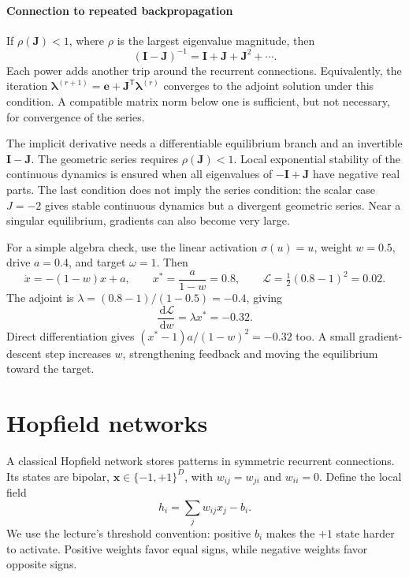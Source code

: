 \documentclass[11pt, oneside]{book}
\newcommand{\dd}{\,\mathrm{d}}
\newcommand{\T}{^{\mathsf{T}}}           %
\newcommand{\loss}{\mathcal{L}}          %
\newcommand{\params}{\boldsymbol{\theta}}   %
\let\originalsection\section
\renewcommand{\section}{\Needspace{7\baselineskip}\originalsection}
\begin{document}
\paragraph{Connection to repeated backpropagation} If $\rho(\mathbf{J})<1$, where $\rho$ is the largest eigenvalue magnitude, then
\[
 (\mathbf{I}-\mathbf{J})^{-1}=\mathbf{I}+\mathbf{J}+\mathbf{J}^2+\cdots.
\]
Each power adds another trip around the recurrent connections. Equivalently, the iteration $\boldsymbol{\lambda}^{(r+1)}=\mathbf{e}+\mathbf{J}\T\boldsymbol{\lambda}^{(r)}$ converges to the adjoint solution under this condition. A compatible matrix norm below one is sufficient, but not necessary, for convergence of the series.

\begin{notebox}[title={Three conditions that should not be mixed up}]
The implicit derivative needs a differentiable equilibrium branch and an invertible $\mathbf{I}-\mathbf{J}$. The geometric series requires $\rho(\mathbf{J})<1$. Local exponential stability of the continuous dynamics is ensured when all eigenvalues of $-\mathbf{I}+\mathbf{J}$ have negative real parts. The last condition does not imply the series condition: the scalar case $J=-2$ gives stable continuous dynamics but a divergent geometric series. Near a singular equilibrium, gradients can also become very large.
\end{notebox}

\begin{exbox}[title={One recurrent unit, with a checkable gradient}]
For a simple algebra check, use the linear activation $\sigma(u)=u$, weight $w=0.5$, drive $a=0.4$, and target $\omega=1$. Then
\[
 \dot x=-(1-w)x+a,\qquad x^*=\frac{a}{1-w}=0.8,
 \qquad \loss=\tfrac12(0.8-1)^2=0.02.
\]
The adjoint is $\lambda=(0.8-1)/(1-0.5)=-0.4$, giving
\[
 \frac{\dd\loss}{\dd w}=\lambda x^*=-0.32.
\]
Direct differentiation gives $(x^*-1)a/(1-w)^2=-0.32$ too. A small gradient-descent step increases $w$, strengthening feedback and moving the equilibrium toward the target.
\end{exbox}

\section{Hopfield networks}\label{sec:source-10-2}
A classical Hopfield network stores patterns in symmetric recurrent connections. Its states are bipolar, $\mathbf{x}\in\{-1,+1\}^D$, with $w_{ij}=w_{ji}$ and $w_{ii}=0$. Define the local field
\[
 h_i=\sum_jw_{ij}x_j-b_i.
\]
We use the lecture's threshold convention: positive $b_i$ makes the $+1$ state harder to activate. Positive weights favor equal signs, while negative weights favor opposite signs.
\end{document}
